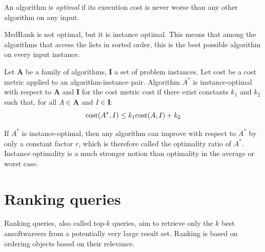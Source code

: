 \documentclass[12pt, a4paper]{report}
\begin{document}
    \begin{definition}
        An algorithm is \emph{optimal} if its execution cost is never worse than any other algorithm on any input.
    \end{definition}
    MedRank is not optimal, but it is instance optimal. This means that among the algorithms that access the lists in sorted order, this is the best possible algorithm on every 
    input instance. 
    \begin{definition}
        Let $\boldsymbol{A}$ be a family of algorithms, $\boldsymbol{I}$ a set of problem instances. Let cost be a cost metric applied to an algorithm-instance pair. Algorithm 
        $A^{*}$ is instance-optimal with respect to $\boldsymbol{A}$ and $\boldsymbol{I}$ for the cost metric cost if there exist constants $k_1$ and $k_2$ such that, for all 
        $A \in \boldsymbol{A}$ and $I \in \boldsymbol{I}$: 
        \[\textnormal{cost}(A^{*}, I) \leq k_1 \textnormal{cost}(A, I) + k_2\]
    \end{definition}
    If $A^{*}$ is instance-optimal, then any algorithm can improve with respect to $A^{*}$ by only a constant factor $r$, which is therefore called the optimality ratio of $A^{*}$. 
    Instance optimality is a much stronger notion than optimality in the average or worst case. 

    \section{Ranking queries}
    Ranking queries, also called top-$k$ queries, aim to retrieve only the $k$ best ansoftwareers from a potentially very large result set. Ranking is based on ordering objects based on their relevance.
\end{document}

